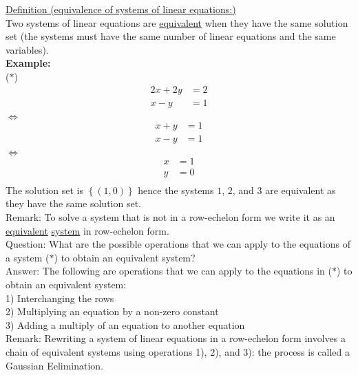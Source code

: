 \documentclass{jhwhw}
\begin{document}
\underline{Definition (equivalence of systems of linear equations:)}
\\

Two systems of linear equations are \underline{equivalent} when they have the same solution set (the systems must have the same number of linear equations and the same variables).
\\

\textbf{Example:}
\\

(\(\ast\)) \begin{align*} 
    2x+2y&=2 \\
    x-y&=1 \\
\end{align*}
\(\Leftrightarrow\)\\
\begin{align*} 
x+y&=1 \\
x-y&=1 \\
\end{align*}
\(\Leftrightarrow\) \\
\begin{align*} 
x&=1 \\
y&=0 \\
\end{align*}
The solution set is \(\left\{(1,0)\right\}\) hence the systems \(\boxed{1}\), \(\boxed{2}\), and \(\boxed{3}\) are equivalent as they have the same solution set.
\\

Remark: To solve a system that is not in a row-echelon form we write it as an \underline{equivalent} \underline{system} in row-echelon form.
\\

Question: What are the possible operations that we can apply to the equations of a system (\(\ast\)) to obtain an equivalent system?
\\
Answer: The following are operations that we can apply to the equations in (\(\ast\)) to obtain an equivalent system:\\
1) Interchanging the rows \\
2) Multiplying an equation by a non-zero constant \\
3) Adding a multiply of an equation to another equation
\\

 Remark: Rewriting a system of linear equations in a row-echelon form involves a chain of equivalent systems using operations 1), 2), and 3): the process is called a Gaussian Eelimination.
 \\
\end{document}

